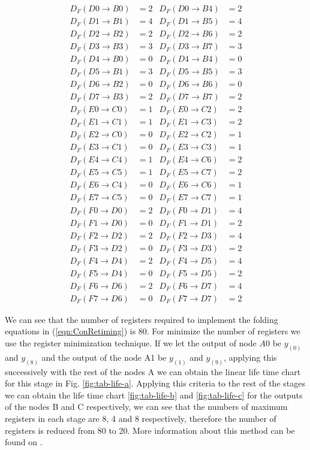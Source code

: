 \documentclass[journal,comsoc]{IEEEtran}
\begin{document}
\begin{small}
\begin{align}\label{eqn:ConRetiming} 
D_F(D0\to B0)&=2 &  D_F(D0\to B4)&=2 		 \\
D_F(D1\to B1)&=4 &  D_F(D1\to B5)&=4\nonumber\\
D_F(D2\to B2)&=2 &  D_F(D2\to B6)&=2\nonumber\\
D_F(D3\to B3)&=3 &  D_F(D3\to B7)&=3\nonumber\\
D_F(D4\to B0)&=0 &  D_F(D4\to B4)&=0\nonumber\\
D_F(D5\to B1)&=3 &  D_F(D5\to B5)&=3\nonumber\\
D_F(D6\to B2)&=0 &  D_F(D6\to B6)&=0\nonumber\\
D_F(D7\to B3)&=2 &  D_F(D7\to B7)&=2\nonumber\\
D_F(E0\to C0)&=1 &  D_F(E0\to C2)&=2\nonumber\\
D_F(E1\to C1)&=1 &  D_F(E1\to C3)&=2\nonumber\\
D_F(E2\to C0)&=0 &  D_F(E2\to C2)&=1\nonumber\\
D_F(E3\to C1)&=0 &  D_F(E3\to C3)&=1\nonumber\\
D_F(E4\to C4)&=1 &  D_F(E4\to C6)&=2\nonumber\\
D_F(E5\to C5)&=1 &  D_F(E5\to C7)&=2\nonumber\\
D_F(E6\to C4)&=0 &  D_F(E6\to C6)&=1\nonumber\\
D_F(E7\to C5)&=0 &  D_F(E7\to C7)&=1\nonumber\\
D_F(F0\to D0)&=2 &  D_F(F0\to D1)&=4\nonumber\\
D_F(F1\to D0)&=0 &  D_F(F1\to D1)&=2\nonumber\\
D_F(F2\to D2)&=2 &  D_F(F2\to D3)&=4\nonumber\\
D_F(F3\to D2)&=0 &  D_F(F3\to D3)&=2\nonumber\\
D_F(F4\to D4)&=2 &  D_F(F4\to D5)&=4\nonumber\\
D_F(F5\to D4)&=0 &  D_F(F5\to D5)&=2\nonumber\\
D_F(F6\to D6)&=2 &  D_F(F6\to D7)&=4\nonumber\\
D_F(F7\to D6)&=0 &  D_F(F7\to D7)&=2\nonumber
\end{align}
\end{small}
We can see that the number of registers required to implement the folding equations in (\ref{eqn:ConRetiming}) is 80. For minimize the number of registers we use the register minimization technique. 
If we let the output of node $A0$ be $y_{(0)}$ and $y_{(8)}$ and the output of the node A1 be $y_{(1)}$ and $y_{(9)}$, applying this successively with the rest of the nodes A we can obtain the linear life time chart for this stage in Fig. \ref{fig:tab-life-a}. Applying this criteria to the rest of the stages we can obtain the life time chart \ref{fig:tab-life-b} and \ref{fig:tab-life-c} for the outputs of the nodes B and C respectively, we can see that the numbers of maximum registers in each stage are 8, 4 and 8 respectively, therefore the number of registers is reduced from 80 to 20. More information about this method can be found on \cite{folding_parhi_book}.
\end{document}
